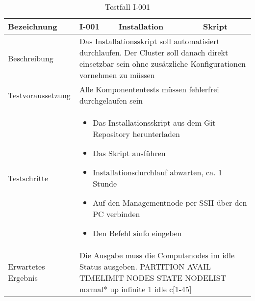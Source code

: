 \begin{table}[H]
\centering
\begin{tabular}{|p{4cm}|p{4cm}|p{4cm}|p{4cm}|}
\hline
Bezeichnung & \textbf{I-001} & Installation & Skript \\\hline
Beschreibung & \multicolumn{3}{p{12cm}|}{Das Installationsskript soll automatisiert durchlaufen. Der Cluster soll danach direkt einsetzbar sein ohne zusätzliche Konfigurationen vornehmen zu müssen} \\\hline
Testvoraussetzung & \multicolumn{3}{p{12cm}|}{Alle Komponententests müssen fehlerfrei durchgelaufen sein} \\\hline
Testschritte & \multicolumn{3}{p{12cm}|}{\begin{itemize}
\item Das Installationsskript aus dem Git Repository herunterladen
\item Das Skript ausführen
\item Installationsdurchlauf abwarten, ca. 1 Stunde
\item Auf den Managementnode per SSH über den PC verbinden
\item Den Befehl sinfo eingeben
\end{itemize}} \\ \hline
Erwartetes Ergebnis & \multicolumn{3}{p{12cm}|}{Die Ausgabe muss die Computenodes im idle Status ausgeben.\newline
PARTITION AVAIL  TIMELIMIT  NODES  STATE NODELIST\newline
normal*      up   infinite      1   idle c[1-45]}\\\hline
\end{tabular}
\caption{Testfall I-001}
\label{Testfall I-001}
\end{table}

